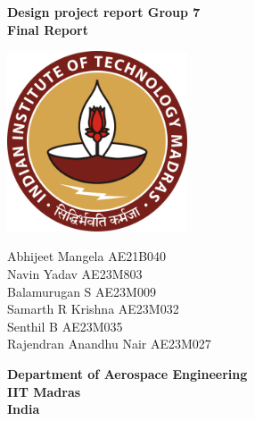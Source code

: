 \documentclass[12 pt]{article}
\begin{document}
\begin{titlepage}
\begin{center}

\textbf{\huge Design project report Group 7 \\ \vspace{0.5 cm} Final Report} \\

\vspace{2 cm}

\centering
\includegraphics[width=0.4\textwidth]{IIT_Madras_Logo.svg.png}
\label{fig:my_label}

\vspace{2 cm}

\Large{Abhijeet Mangela AE21B040 \\ \vspace{0.2 cm} Navin Yadav AE23M803 \\ \vspace{0.2 cm} Balamurugan S AE23M009 \\ \vspace{0.2 cm} Samarth R Krishna AE23M032 \\ \vspace{0.2 cm} Senthil B AE23M035 \\ \vspace{0.2 cm} Rajendran Anandhu Nair AE23M027 }

\vspace{1.0 cm}

\textbf{\Large Department of Aerospace Engineering } \\ \vspace{0.2 cm}
\textbf{\Large IIT Madras} \\ \vspace{0.2 cm}
\textbf{\Large India} \\ 

\normalsize

\end{center}
\end{titlepage}
\end{document}
